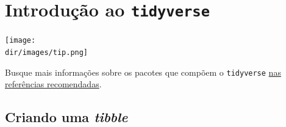 \documentclass[
  11pt]{report}
\newcommand{\dir}{/ssd/R/x86_64-pc-linux-gnu-library/4.3/fnaufelRmd/rmarkdown/resources}
\newenvironment{rmdtip}
{
  \begin{mytip}
    \texttt{[image: \\dir/images/tip.png]}
    \tcblower
  }
  {
  \end{mytip}
}
\begin{document}
\hypertarget{introduuxe7uxe3o-ao-tidyverse}{%
\chapter{\texorpdfstring{Introdução ao \texttt{tidyverse}}{Introdução ao tidyverse}}\label{introduuxe7uxe3o-ao-tidyverse}}

\begin{rmdtip}
Busque mais informações sobre os pacotes que compõem o \texttt{tidyverse} \protect\hyperlink{refrec}{nas referências recomendadas}.

\end{rmdtip}

\hypertarget{criando-uma-tibble}{%
\section{\texorpdfstring{Criando uma \emph{tibble}}{Criando uma tibble}}\label{criando-uma-tibble}}
\end{document}
